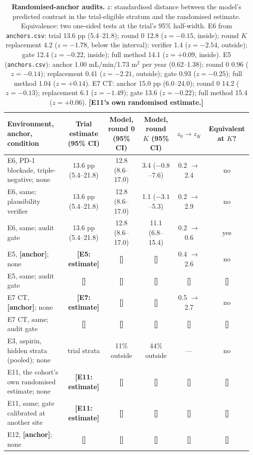 \documentclass[11pt,a4paper]{article}
\newcommand{\tbd}[1]{{\color{red}\textbf{[#1]}}}
\begin{document}
\begin{table}[!htbp]\centering\footnotesize
\caption{\textbf{Randomised-anchor audits.} $z$: standardised distance between the model's predicted contrast in the trial-eligible stratum and the randomised estimate. Equivalence: two one-sided tests at the trial's 95\% half-width. E6 from \texttt{anchors.csv}: trial 13.6 pp (5.4--21.8); round 0 12.8 ($z=-0.15$, inside); round $K$ replacement 4.2 ($z=-1.78$, below the interval); verifier 1.4 ($z=-2.54$, outside); gate 12.4 ($z=-0.22$, inside); full method 14.1 ($z=+0.09$, inside). E5 (\texttt{anchors.csv}): anchor 1.00 mL/min/1.73 m$^2$ per year (0.62--1.38); round 0 0.96 ($z=-0.14$); replacement 0.41 ($z=-2.21$, outside); gate 0.93 ($z=-0.25$); full method 1.04 ($z=+0.14$). E7 CT: anchor 15.0 pp (6.0--24.0); round 0 14.2 ($z=-0.13$); replacement 6.1 ($z=-1.49$); gate 13.6 ($z=-0.22$); full method 15.4 ($z=+0.06$). \tbd{E11's own randomised estimate.}}\label{tab:raa}
\begin{tabularx}{\textwidth}{@{}p{4.2cm} C C C c C@{}}\toprule
Environment, anchor, condition & Trial estimate (95\% CI) & Model, round 0 (95\% CI) & Model, round $K$ (95\% CI) & $z_0\to z_K$ & Equivalent at $K$?\\\midrule
E6, PD-1 blockade, triple-negative; none & 13.6 pp (5.4--21.8) & 12.8 (8.6--17.0) & 3.4 ($-0.8$--7.6) & 0.2 $\to$ 2.4 & no\\
E6, same; plausibility verifier & 13.6 pp (5.4--21.8) & 12.8 (8.6--17.0) & 1.1 ($-3.1$--5.3) & 0.2 $\to$ 2.9 & no\\
E6, same; audit gate & 13.6 pp (5.4--21.8) & 12.8 (8.6--17.0) & 11.1 (6.8--15.4) & 0.2 $\to$ 0.6 & yes\\
E5, \tbd{anchor}; none & \tbd{E5: estimate} & \tbd{} & \tbd{} & 0.4 $\to$ 2.6 & no\\
E5, same; audit gate & \tbd{} & \tbd{} & \tbd{} & \tbd{} & \tbd{}\\
E7 CT, \tbd{anchor}; none & \tbd{E7: estimate} & \tbd{} & \tbd{} & 0.5 $\to$ 2.7 & no\\
E7 CT, same; audit gate & \tbd{} & \tbd{} & \tbd{} & \tbd{} & \tbd{}\\
E3, aspirin, hidden strata (pooled); none & trial strata & 11\% outside & 44\% outside & --- & no\\
E11, the cohort's own randomised estimate; none & \tbd{E11: estimate} & \tbd{} & \tbd{} & \tbd{} & \tbd{}\\
E11, same; gate calibrated at another site & \tbd{E11: estimate} & \tbd{} & \tbd{} & \tbd{} & \tbd{}\\
E12, \tbd{anchor}; none & \tbd{} & \tbd{} & \tbd{} & \tbd{} & \tbd{}\\
\bottomrule\end{tabularx}
\end{table}
\end{document}
